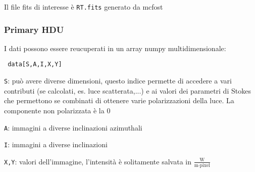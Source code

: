 \documentclass[DIN, pagenumber=false, fontsize=11pt, parskip=half]{scrartcl}
\begin{document}
Il file fits di interesse è \lstinline{RT.fits} generato da mcfost
\subsubsection{Primary HDU}

I dati possono essere reucuperati in un array numpy multidimensionale:
\begin{lstlisting}
 data[S,A,I,X,Y]
\end{lstlisting}

\lstinline{S}: può avere diverse dimensioni, questo indice permette di accedere a vari contributi (se calcolati, es. luce scatterata,...) e ai valori dei parametri di Stokes che permettono se combinati di ottenere varie polarizzazioni della luce. La componente non polarizzata è la 0

\lstinline{A}: immagini a diverse inclinazioni azimuthali

\lstinline{I}: immagini a diverse inclinazioni

\lstinline{X,Y}: valori dell'immagine, l'intensità è solitamente salvata in $\frac{\text{W}}{\text{m}\cdot \text{pixel}}$
\end{document}
